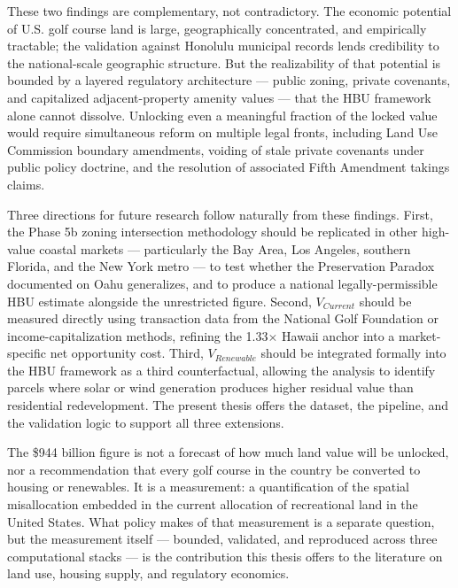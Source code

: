 \documentclass[11pt, letterpaper]{article}
\begin{document}
These two findings are complementary, not contradictory. The economic potential of U.S. golf course land is large, geographically concentrated, and empirically tractable; the validation against Honolulu municipal records lends credibility to the national-scale geographic structure. But the realizability of that potential is bounded by a layered regulatory architecture --- public zoning, private covenants, and capitalized adjacent-property amenity values --- that the HBU framework alone cannot dissolve. Unlocking even a meaningful fraction of the locked value would require simultaneous reform on multiple legal fronts, including Land Use Commission boundary amendments, voiding of stale private covenants under public policy doctrine, and the resolution of associated Fifth Amendment takings claims.

Three directions for future research follow naturally from these findings. First, the Phase 5b zoning intersection methodology should be replicated in other high-value coastal markets --- particularly the Bay Area, Los Angeles, southern Florida, and the New York metro --- to test whether the Preservation Paradox documented on Oahu generalizes, and to produce a national legally-permissible HBU estimate alongside the unrestricted figure. Second, $V_{Current}$ should be measured directly using transaction data from the National Golf Foundation or income-capitalization methods, refining the 1.33$\times$ Hawaii anchor into a market-specific net opportunity cost. Third, $V_{Renewable}$ should be integrated formally into the HBU framework as a third counterfactual, allowing the analysis to identify parcels where solar or wind generation produces higher residual value than residential redevelopment. The present thesis offers the dataset, the pipeline, and the validation logic to support all three extensions.

The \$944 billion figure is not a forecast of how much land value will be unlocked, nor a recommendation that every golf course in the country be converted to housing or renewables. It is a measurement: a quantification of the spatial misallocation embedded in the current allocation of recreational land in the United States. What policy makes of that measurement is a separate question, but the measurement itself --- bounded, validated, and reproduced across three computational stacks --- is the contribution this thesis offers to the literature on land use, housing supply, and regulatory economics.

\newpage

\printbibliography[title={References}]
\end{document}
